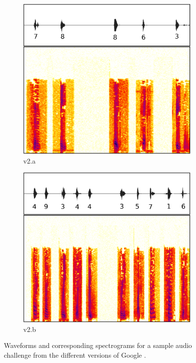 \begin{figure}[tp]
\begin{subfigure}{0.23\textwidth}
        \includegraphics[width=\textwidth]{figures/recaptcha2a.pdf}
        \caption{\re v2.a}
        \label{fig:recaptcha2a}
\end{subfigure}\hspace{0.01\textwidth}
\begin{subfigure}{0.23\textwidth}
        \includegraphics[width=\textwidth]{figures/recaptcha2b.pdf}
        \caption{\re v2.b}
        \label{fig:recaptcha2b}
\end{subfigure}
\caption{Waveforms and corresponding spectrograms for a sample audio challenge from the different versions of Google \re.}
\label{fig:examples}
\end{figure}

